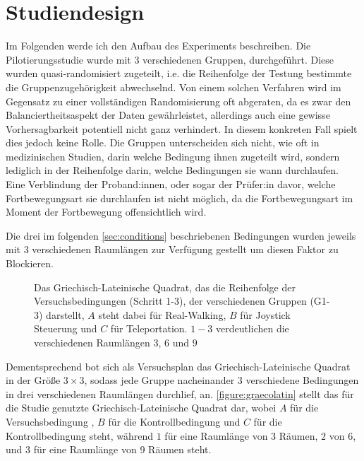     \section{Studiendesign}\label{sec:setup}
    Im Folgenden werde ich den Aufbau des Experiments beschreiben.
    Die Pilotierungsstudie wurde mit 3 verschiedenen Gruppen, durchgeführt.
    Diese wurden quasi-randomisiert zugeteilt, i.e. die Reihenfolge der Testung bestimmte die Gruppenzugehörigkeit abwechselnd. Von einem solchen Verfahren wird im Gegensatz zu einer vollständigen Randomisierung oft abgeraten, da es zwar den Balanciertheitsaspekt der Daten gewährleistet, allerdings auch eine gewisse Vorhersagbarkeit potentiell nicht ganz verhindert. In diesem konkreten Fall spielt dies jedoch keine Rolle. Die Gruppen unterscheiden sich nicht, wie oft in medizinischen Studien, darin welche Bedingung ihnen zugeteilt wird, sondern lediglich in der Reihenfolge darin, welche Bedingungen sie wann durchlaufen. Eine Verblindung der Proband:innen, oder sogar der Prüfer:in davor, welche Fortbewegungsart sie durchlaufen ist nicht möglich, da die Fortbewegungsart im Moment der Fortbewegung offensichtlich wird.

    Die drei im folgenden \autoref{sec:conditions} beschriebenen Bedingungen wurden jeweils mit 3 verschiedenen Raumlängen zur Verfügung gestellt um diesen Faktor zu Blockieren. %

    \begin{figure}
        \centering
        

        \caption{Das Griechisch-Lateinische Quadrat, das die Reihenfolge der Versuchsbedingungen (Schritt 1-3), der verschiedenen Gruppen (G1-3) darstellt, $A$ steht dabei für Real-Walking, $B$ für Joystick Steuerung und $C$ für Teleportation. $1-3$ verdeutlichen die verschiedenen Raumlängen $3$, $6$ und $9$}\label{figure:graecolatin}
    \end{figure}

    Dementsprechend bot sich als Versuchsplan das Griechisch-Lateinische Quadrat in der Größe $3 \times 3$, sodass jede Gruppe nacheinander 3 verschiedene Bedingungen in drei verschiedenen Raumlängen durchlief, an. \autoref{figure:graecolatin} stellt das für die Studie genutzte Griechisch-Lateinische Quadrat dar, wobei $A$ für die Versuchsbedingung , $B$ für die Kontrollbedingung  und $C$ für die Kontrollbedingung  steht, während $1$ für eine Raumlänge von 3 Räumen, $2$ von 6, und $3$ für eine Raumlänge von 9 Räumen steht.

